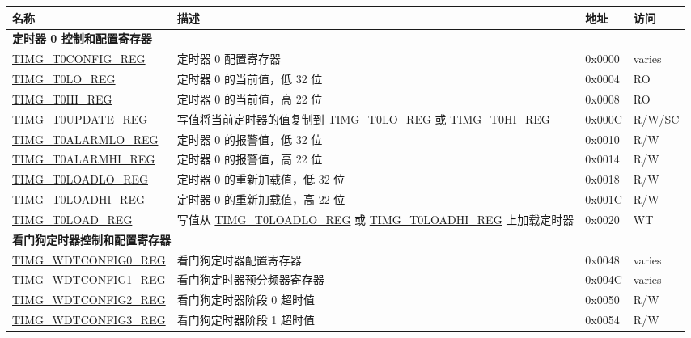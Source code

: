 
\begin{longtable}{ | p{6cm} | p{7.2cm} | p{1.3cm} | p{1cm} | }
    \hline\rowcolor{lightgray}
    名称 & 描述 &  地址 & 访问 \\ \hline
    \endhead
    \multicolumn{4}{|l|}{\textbf{定时器 0 控制和配置寄存器}} \\ \hline
    \hyperref[regdesc:TIMGTXCONFIGREG]{TIMG\_T0CONFIG\_REG} & 定时器 0 配置寄存器 & 0x0000 & varies \\ \hline
    \hyperref[regdesc:TIMGTXLOREG]{TIMG\_T0LO\_REG} & 定时器 0 的当前值，低 32 位 & 0x0004 & RO \\ \hline
    \hyperref[regdesc:TIMGTXHIREG]{TIMG\_T0HI\_REG} & 定时器 0 的当前值，高 22 位 & 0x0008 & RO \\ \hline
    \hyperref[regdesc:TIMGTXUPDATEREG]{TIMG\_T0UPDATE\_REG} & 写值将当前定时器的值复制到 \hyperref[regdesc:TIMGTXLOREG]{TIMG\_T0LO\_REG} 或 \hyperref[regdesc:TIMGTXHIREG]{TIMG\_T0HI\_REG} & 0x000C & R/W/SC \\ \hline
    \hyperref[regdesc:TIMGTXALARMLOREG]{TIMG\_T0ALARMLO\_REG} & 定时器 0 的报警值，低 32 位 & 0x0010 & R/W \\ \hline
    \hyperref[regdesc:TIMGTXALARMHIREG]{TIMG\_T0ALARMHI\_REG} & 定时器 0 的报警值，高 22 位 & 0x0014 & R/W \\ \hline
    \hyperref[regdesc:TIMGTXLOADLOREG]{TIMG\_T0LOADLO\_REG} & 定时器 0 的重新加载值，低 32 位 & 0x0018 & R/W \\ \hline
    \hyperref[regdesc:TIMGTXLOADHIREG]{TIMG\_T0LOADHI\_REG} & 定时器 0 的重新加载值，高 22 位 & 0x001C & R/W \\ \hline
    \hyperref[regdesc:TIMGTXLOADREG]{TIMG\_T0LOAD\_REG} & 写值从 \hyperref[regdesc:TIMGTXLOADLOREG]{TIMG\_T0LOADLO\_REG} 或 \hyperref[regdesc:TIMGTXLOADHIREG]{TIMG\_T0LOADHI\_REG} 上加载定时器 & 0x0020 & WT \\ \hline
    \multicolumn{4}{|l|}{\textbf{看门狗定时器控制和配置寄存器}} \\ \hline
    \hyperref[regdesc:TIMGWDTCONFIG0REG]{TIMG\_WDTCONFIG0\_REG} & 看门狗定时器配置寄存器 & 0x0048 & varies \\ \hline
    \hyperref[regdesc:TIMGWDTCONFIG1REG]{TIMG\_WDTCONFIG1\_REG} & 看门狗定时器预分频器寄存器 & 0x004C & varies \\ \hline
    \hyperref[regdesc:TIMGWDTCONFIG2REG]{TIMG\_WDTCONFIG2\_REG} & 看门狗定时器阶段 0 超时值 & 0x0050 & R/W \\ \hline
    \hyperref[regdesc:TIMGWDTCONFIG3REG]{TIMG\_WDTCONFIG3\_REG} & 看门狗定时器阶段 1 超时值 & 0x0054 & R/W \\ \hline

\end{longtable}
